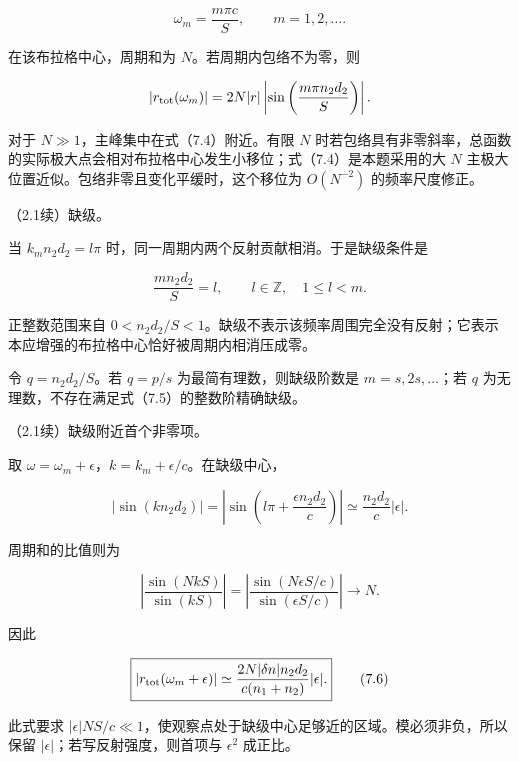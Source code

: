 \documentclass[12pt,a4paper,fontset=fandol]{ctexart}
\begin{document}
\[
\boxed{\omega_m=\frac{m\pi c}{S},\qquad m=1,2,\ldots.}
\tag{7.4}
\]

在该布拉格中心，周期和为 \(N\)。若周期内包络不为零，则

\[
|r_{\rm tot}(\omega_m)|
=2N|r|\left|\sin\left(\frac{m\pi n_2d_2}{S}\right)\right|.
\]

对于 \(N\gg1\)，主峰集中在式（7.4）附近。有限 \(N\)
时若包络具有非零斜率，总函数的实际极大点会相对布拉格中心发生小移位；式（7.4）是本题采用的大
\(N\) 主极大位置近似。包络非零且变化平缓时，这个移位为 \(O(N^{-2})\)
的频率尺度修正。

（2.1续）缺级。

当 \(k_mn_2d_2=l\pi\) 时，同一周期内两个反射贡献相消。于是缺级条件是

\[
\boxed{\frac{m n_2d_2}{S}=l,\qquad
l\in\mathbb Z,\quad 1\le l<m.}
\tag{7.5}
\]

正整数范围来自
\(0<n_2d_2/S<1\)。缺级不表示该频率周围完全没有反射；它表示本应增强的布拉格中心恰好被周期内相消压成零。

令 \(q=n_2d_2/S\)。若 \(q=p/s\) 为最简有理数，则缺级阶数是
\(m=s,2s,\ldots\)；若 \(q\)
为无理数，不存在满足式（7.5）的整数阶精确缺级。

（2.1续）缺级附近首个非零项。

取 \(\omega=\omega_m+\epsilon\)，\(k=k_m+\epsilon/c\)。在缺级中心，

\[
|\sin(kn_2d_2)|=
\left|\sin\left(l\pi+\frac{\epsilon n_2d_2}{c}\right)\right|
\simeq\frac{n_2d_2}{c}|\epsilon|.
\]

周期和的比值则为

\[
\left|\frac{\sin(NkS)}{\sin(kS)}\right|
=\left|\frac{\sin(N\epsilon S/c)}{\sin(\epsilon S/c)}\right|
\longrightarrow N.
\]

因此

\[
\boxed{|r_{\rm tot}(\omega_m+\epsilon)|
\simeq\frac{2N|\delta n|n_2d_2}{c(n_1+n_2)}|\epsilon|.}
\tag{7.6}
\]

此式要求
\(|\epsilon|NS/c\ll1\)，使观察点处于缺级中心足够近的区域。模必须非负，所以保留
\(|\epsilon|\)；若写反射强度，则首项与 \(\epsilon^2\) 成正比。
\end{document}
